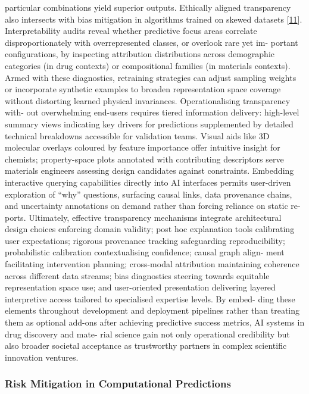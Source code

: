 \documentclass[
]{article}
\begin{document}
particular combinations yield superior outputs. Ethically aligned
transparency also intersects with bias mitigation in algorithms trained
on skewed datasets {[}\protect\hyperlink{_bookmark51}{11}{]}.
Interpretability audits reveal whether predictive focus areas correlate
disproportionately with overrepresented classes, or overlook rare yet
im- portant configurations, by inspecting attribution distributions
across demographic categories (in drug contexts) or compositional
families (in materials contexts). Armed with these diagnostics,
retraining strategies can adjust sampling weights or incorporate
synthetic examples to broaden representation space coverage without
distorting learned physical invariances. Operationalising transparency
with- out overwhelming end-users requires tiered information delivery:
high-level summary views indicating key drivers for predictions
supplemented by detailed technical breakdowns accessible for validation
teams. Visual aids like 3D molecular overlays coloured by feature
importance offer intuitive insight for chemists; property-space plots
annotated with contributing descriptors serve materials engineers
assessing design candidates against constraints. Embedding interactive
querying capabilities directly into AI interfaces permits user-driven
exploration of ``why'' questions, surfacing causal links, data
provenance chains, and uncertainty annotations on demand rather than
forcing reliance on static re- ports. Ultimately, effective transparency
mechanisms integrate architectural design choices enforcing domain
validity; post hoc explanation tools calibrating user expectations;
rigorous provenance tracking safeguarding reproducibility; probabilistic
calibration contextualising confidence; causal graph align- ment
facilitating intervention planning; cross-modal attribution maintaining
coherence across different data streams; bias diagnostics steering
towards equitable representation space use; and user-oriented
presentation delivering layered interpretive access tailored to
specialised expertise levels. By embed- ding these elements throughout
development and deployment pipelines rather than treating them as
optional add-ons after achieving predictive success metrics, AI systems
in drug discovery and mate- rial science gain not only operational
credibility but also broader societal acceptance as trustworthy partners
in complex scientific innovation ventures.

\hypertarget{risk-mitigation-in-computational-predictions}{%
\subsubsection{Risk Mitigation in Computational
Predictions}\label{risk-mitigation-in-computational-predictions}}
\end{document}
